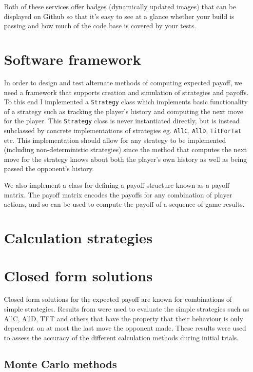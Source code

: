 \documentclass[a4paper,12pt]{article}
\begin{document}
Both of these services offer badges (dynamically updated images) that can be displayed on Github so that it's easy to see at a glance whether your build is passing and how much of the code base is covered by your tests.

\section{Software framework}

In order to design and test alternate methods of computing expected payoff, we need a framework that supports creation and simulation of strategies and payoffs.
To this end I implemented a \texttt{Strategy} class which implements basic functionality of a strategy such as tracking the player's history and computing the next move for the player.
This \texttt{Strategy} class is never instantiated directly, but is instead subclassed by concrete implementations of strategies eg. \texttt{AllC}, \texttt{AllD}, \texttt{TitForTat} etc.
This implementation should allow for any strategy to be implemented (including non-deterministic strategies) since the method that computes the next move for the strategy knows about both the player's own history as well as being passed the opponent's history.

We also implement a class for defining a payoff structure known as a payoff matrix.
The payoff matrix encodes the payoffs for any combination of player actions, and so can be used to compute the payoff of a sequence of game results.

\section{Calculation strategies}

\section{Closed form solutions}

Closed form solutions for the expected payoff are known for combinations of simple strategies.
Results from \cite{garciaandtraulsen} were used to evaluate the simple strategies such as AllC, AllD, TFT and others that have the property that their behaviour is only dependent on at most the last move the opponent made.
These results were used to assess the accuracy of the different calculation methods during initial trials.

\subsection{Monte Carlo methods}
\end{document}
